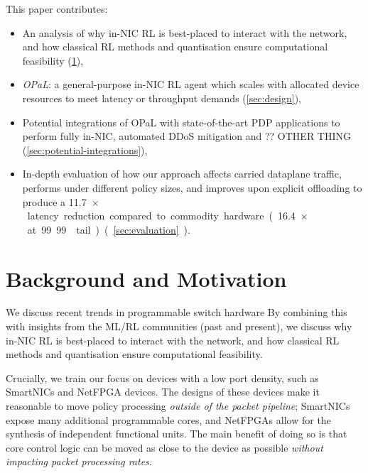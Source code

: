 \documentclass[sigconf,natbib=false]{acmart}
\newcommand{\approachshort}{OPaL}
\begin{document}
This paper contributes:
\begin{itemize}
	\item An analysis of why in-NIC RL is best-placed to interact with the network, and how classical RL methods and quantisation ensure computational feasibility (\cref{sec:motivation}),
	\item \emph{\approachshort{}}: a general-purpose in-NIC RL agent which scales with allocated device resources to meet latency or throughput demands (\cref{sec:design}),
	\item Potential integrations of \approachshort{} with state-of-the-art PDP applications to perform fully in-NIC, automated DDoS mitigation and ?? OTHER THING (\cref{sec:potential-integrations}),
	\item In-depth evaluation of how our approach affects carried dataplane traffic, performs under different policy sizes, and improves upon explicit offloading to produce a \SI{11.7}{$\times$} latency reduction compared to commodity hardware (\SI{16.4}{$\times$} at 99.99 tail) (\cref{sec:evaluation}).
\end{itemize}

\section{Background and Motivation}\label{sec:motivation}
We discuss recent trends in programmable switch hardware
By combining this with insights from the ML/RL communities (past and present), we discuss why in-NIC RL is best-placed to interact with the network, and how classical RL methods and quantisation ensure computational feasibility.

Crucially, we train our focus on devices with a low port density, such as SmartNICs and NetFPGA devices.
The designs of these devices make it reasonable to move policy processing \emph{outside of the packet pipeline}; SmartNICs expose many additional programmable cores, and NetFPGAs allow for the synthesis of independent functional units.
The main benefit of doing so is that core control logic can be moved as close to the device as possible \emph{without impacting packet processing rates}.
\end{document}
